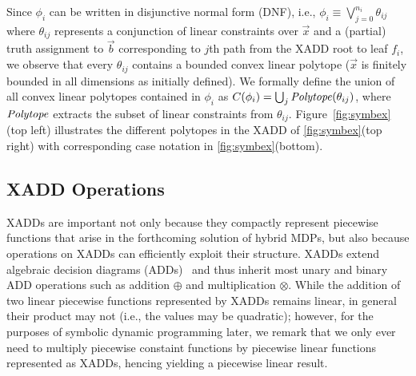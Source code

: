 %

%
Since $\phi_i$ can be written in disjunctive normal form (DNF), i.e.,
$\phi_i \equiv \bigvee_{j=0}^{n_i} \theta_{ij}$ where $\theta_{ij}$
represents a conjunction of linear constraints over $\vec{x}$ and a
(partial) truth assignment to $\vec{b}$ corresponding to $j$th path
from the XADD root to leaf $f_i$, we observe that every
$\theta_{ij}$ contains a bounded convex linear polytope ($\vec{x}$ is
finitely bounded in all dimensions as initially defined).  
We formally define the union of all convex linear polytopes contained in 
$\phi_i$ as
$C(\phi_i) = \bigcup_j \mathit{Polytope}(\theta_{ij})$, 
where $\mathit{Polytope}$ extracts the subset of linear constraints from
$\theta_{ij}$. Figure~\ref{fig:symbex}(top left) illustrates the different
polytopes in the XADD of \ref{fig:symbex}(top right) with
corresponding case notation in \ref{fig:symbex}(bottom).

\subsection{XADD Operations} 

XADDs are important not only because they compactly represent
piecewise functions that arise in the forthcoming solution of hybrid
MDPs, but also because operations on XADDs can efficiently exploit
their structure.  XADDs extend algebraic decision diagrams
(ADDs)~\cite{bahar93add} and thus inherit most unary and binary ADD
operations such as addition $\oplus$ and multiplication $\otimes$.
While the addition of two linear piecewise functions represented by
XADDs remains linear, in general their product may not (i.e., the values
may be quadratic); however, for the purposes of symbolic dynamic
programming later, we remark that we only ever need to multiply
piecewise constaint functions by piecewise linear functions
represented as XADDs, hencing yielding a piecewise linear result.


